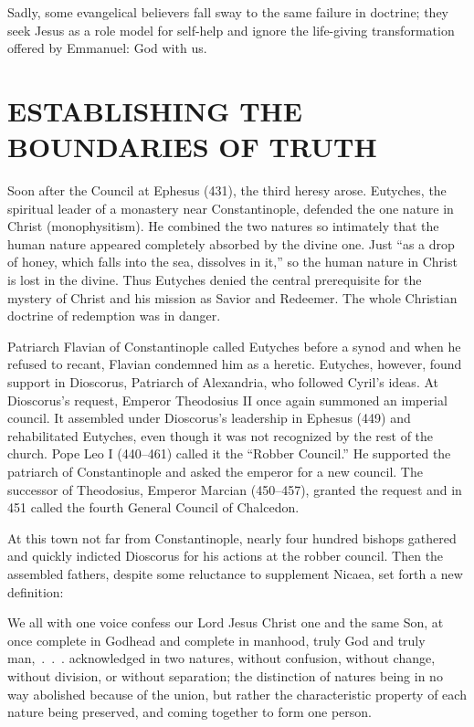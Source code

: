 Sadly, some evangelical believers fall sway to the same failure in doctrine; they seek Jesus as a
role model for self-help and ignore the life-giving transformation offered by Emmanuel: God with us.

\section{ESTABLISHING THE BOUNDARIES OF TRUTH}

Soon after the Council at Ephesus (431), the third heresy arose. Eutyches, the spiritual leader of a
monastery near Constantinople, defended the one nature in Christ (monophysitism). He combined the
two natures so intimately that the human nature appeared completely absorbed by the divine one. Just
“as a drop of honey, which falls into the sea, dissolves in it,” so the human nature in Christ is
lost in the divine. Thus Eutyches denied the central prerequisite for the mystery of Christ and his
mission as Savior and Redeemer. The whole Christian doctrine of redemption was in danger.

Patriarch Flavian of Constantinople called Eutyches before a synod and when he refused to recant,
Flavian condemned him as a heretic. Eutyches, however, found support in Dioscorus, Patriarch of
Alexandria, who followed Cyril’s ideas. At Dioscorus’s request, Emperor Theodosius II once again
summoned an imperial council. It assembled under Dioscorus’s leadership in Ephesus (449) and
rehabilitated Eutyches, even though it was not recognized by the rest of the church. Pope Leo I
(440–461) called it the “Robber Council.” He supported the patriarch of Constantinople and asked the
emperor for a new council. The successor of Theodosius, Emperor Marcian (450–457), granted the
request and in 451 called the fourth General Council of Chalcedon.

At this town not far from Constantinople, nearly four hundred bishops gathered and quickly indicted
Dioscorus for his actions at the robber council. Then the assembled fathers, despite some reluctance
to supplement Nicaea, set forth a new definition:

\begin{blockquote}
We all with one voice confess our Lord Jesus Christ one and the same Son, at once complete in
Godhead and complete in manhood, truly God and truly man,~.~.~. acknowledged in two natures, without
confusion, without change, without division, or without separation; the distinction of natures being
in no way abolished because of the union, but rather the characteristic property of each nature
being preserved, and coming together to form one person.
\end{blockquote}

